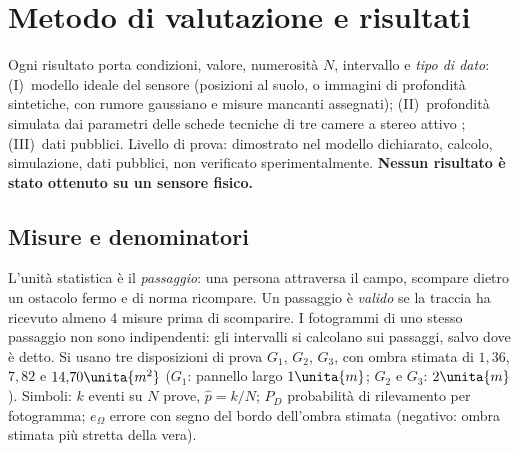 \section{Metodo di valutazione e risultati}\label{sec:val}

Ogni risultato porta condizioni, valore, numerosità $N$, intervallo e \emph{tipo di dato}: (I)~modello ideale del sensore (posizioni al suolo, o immagini di profondità sintetiche, con rumore gaussiano e misure mancanti assegnati); (II)~profondità simulata dai parametri delle schede tecniche di tre camere a stereo attivo \cite{realsense-confronto-camere,realsense-d455,orbbec-gemini-335}; (III)~dati pubblici. Livello di prova:  dimostrato nel modello dichiarato,  calcolo,  simulazione,  dati pubblici,  non verificato sperimentalmente. \textbf{Nessun risultato è stato ottenuto su un sensore fisico.}

\subsection{Misure e denominatori}\label{sec:val-misure}

L'unità statistica è il \emph{passaggio}: una persona attraversa il campo, scompare dietro un ostacolo fermo e di norma ricompare. Un passaggio è \emph{valido} se la traccia ha ricevuto almeno 4 misure prima di scomparire. I fotogrammi di uno stesso passaggio non sono indipendenti: gli intervalli si calcolano sui passaggi, salvo dove è detto. Si usano tre disposizioni di prova $G_1$, $G_2$, $G_3$, con ombra stimata di $1{,}36$, $7{,}82$ e $14{,}70\unita{m^2}$ ($G_1$: pannello largo $1\unita{m}$; $G_2$ e $G_3$: $2\unita{m}$). Simboli: $k$ eventi su $N$ prove, $\hat p=k/N$; $P_D$ probabilità di rilevamento per fotogramma; $e_\Omega$ errore con segno del bordo dell'ombra stimata (negativo: ombra stimata più stretta della vera).

